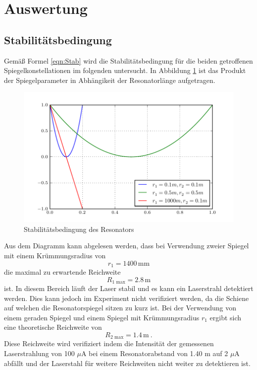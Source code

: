 \section{Auswertung}
\label{sec:Auswertung}

\subsection{Stabilitätsbedingung}
Gemäß Formel \ref{eqn:Stab} wird die Stabilitätsbedingung für die beiden getroffenen Spiegelkonstellationen im folgenden untersucht. In Abbildung \ref{fig:stabi} ist das Produkt der Spiegelparameter in Abhängikeit der Resonatorlänge aufgetragen.
\begin{figure}
  \centering
  \includegraphics[width=\textwidth]{Stabilisationsparameter.pdf}
  \caption{Stabilitätsbedingung des Resonators}
  \label{fig:stabi}
\end{figure}
Aus dem Diagramm kann abgelesen werden, dass bei Verwendung zweier Spiegel mit einem Krümmungsradius von
\begin{equation}
  r_1 = 1400 \, \text{mm}
  \label{eqn:rad1}
\end{equation}
die maximal zu erwartende Reichweite
\begin{equation}
  R_\text{1 max} = 2.8 \, \text{m}
  \label{eqn:rmax1}
\end{equation}
ist. In diesem Bereich läuft der Laser stabil und es kann ein Laserstrahl detektiert werden. Dies kann jedoch im Experiment nicht verifiziert werden, da die Schiene auf welchen die Resonatorspiegel sitzen zu kurz ist. Bei der Verwendung von einem geraden Spiegel und einem Spiegel mit Krümmungsradius $r_1$ ergibt sich eine theoretische Reichweite von
\begin{equation}
  R_\text{2 max} = 1.4 \, \text{m} \ .
  \label{eqn:rmax2}
\end{equation}
Diese Reichweite wird verifiziert indem die Intensität der gemessenen Laserstrahlung von 100 $\mu$A bei einem Resonatorabstand von 1.40 m auf 2 $\mu$A abfällt und der Laserstahl für weitere Reichweiten nicht weiter zu detektieren ist.

